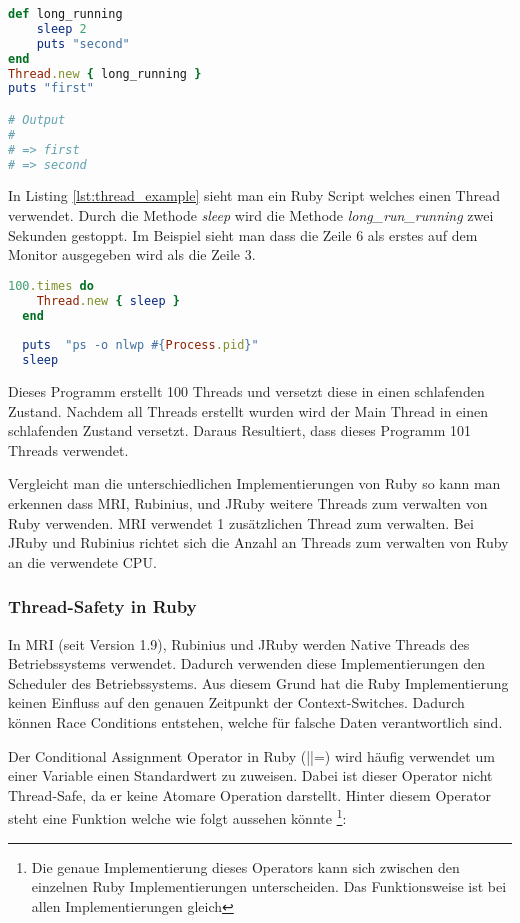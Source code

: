 \begin{lstlisting}[language=Ruby,label=lst:thread_example]
def long_running
	sleep 2
	puts "second"
end
Thread.new { long_running }
puts "first"

# Output
#
# => first
# => second

\end{lstlisting}

In Listing \ref{lst:thread_example} sieht man ein Ruby Script welches einen Thread verwendet. Durch die Methode \emph{sleep} wird die Methode \textit{long\_run\_running} zwei Sekunden gestoppt. Im Beispiel sieht man dass die Zeile 6 als erstes auf dem Monitor ausgegeben wird als die Zeile 3. 


\begin{lstlisting}[language=Ruby,caption=Adaptiert von \cite{Sto2013}]
  100.times do
    Thread.new { sleep }
  end
  
  puts  "ps -o nlwp #{Process.pid}"
  sleep
\end{lstlisting} 

Dieses Programm erstellt 100 Threads und versetzt diese in einen schlafenden Zustand. Nachdem all Threads erstellt wurden wird der Main Thread in einen schlafenden Zustand versetzt. Daraus Resultiert, dass dieses Programm 101 Threads verwendet. 

Vergleicht man die unterschiedlichen Implementierungen von Ruby so kann man erkennen dass MRI, Rubinius, und JRuby weitere Threads zum verwalten von Ruby verwenden. MRI verwendet 1 zusätzlichen Thread zum verwalten. Bei JRuby und Rubinius richtet sich die Anzahl an Threads zum verwalten von Ruby an die verwendete CPU.

\subsubsection{Thread-Safety in Ruby}
In MRI (seit Version 1.9), Rubinius und JRuby werden Native Threads des Betriebssystems verwendet. Dadurch verwenden diese Implementierungen den Scheduler des Betriebssystems. Aus diesem Grund hat die Ruby Implementierung keinen Einfluss auf den genauen Zeitpunkt der Context-Switches. Dadurch können Race Conditions entstehen, welche für falsche Daten verantwortlich sind.

Der Conditional Assignment Operator in Ruby (||=) wird häufig verwendet um einer Variable einen Standardwert zu zuweisen. Dabei ist dieser Operator nicht Thread-Safe, da er keine Atomare Operation darstellt. Hinter diesem Operator steht eine Funktion welche wie folgt aussehen könnte \footnote{Die genaue Implementierung dieses Operators kann sich zwischen den einzelnen Ruby Implementierungen unterscheiden. Das Funktionsweise ist bei allen Implementierungen gleich}:


